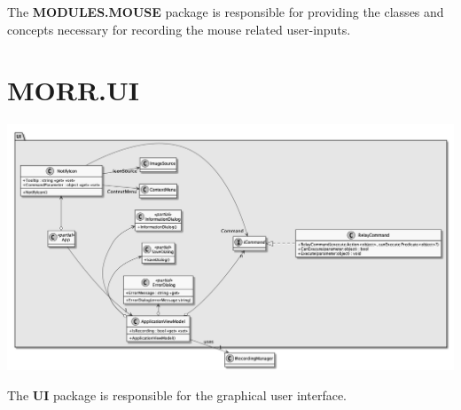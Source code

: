 The \textbf{MODULES.MOUSE} package is responsible for providing the classes and concepts necessary for recording the mouse related user-inputs.

\begin{packclass}
\end{packclass}

\begin{packenum}
\end{packenum}
\newpage

\section{MORR.UI}

\begin{center}
    \includegraphics[width=1.0\textwidth]{resources/Packages/UI.png}
\end{center}

The \textbf{UI} package is responsible for the graphical user interface.

\begin{packclass}
\end{packclass}

